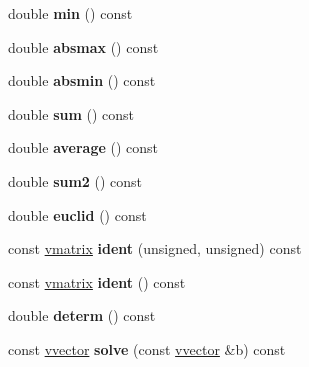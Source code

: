 \begin{DoxyCompactItemize}
\item 
double {\bfseries min} () const \hypertarget{classvmatrix_a825940bfd88c4cc05b129263b6383d8f}{}\label{classvmatrix_a825940bfd88c4cc05b129263b6383d8f}

\item 
double {\bfseries absmax} () const \hypertarget{classvmatrix_a73c48ad906dc6fc47c3d28895de5fbbb}{}\label{classvmatrix_a73c48ad906dc6fc47c3d28895de5fbbb}

\item 
double {\bfseries absmin} () const \hypertarget{classvmatrix_a16c7994199a410269478afd262ffad8e}{}\label{classvmatrix_a16c7994199a410269478afd262ffad8e}

\item 
double {\bfseries sum} () const \hypertarget{classvmatrix_a376a979dd7dd69e21a64c0fad6b2714e}{}\label{classvmatrix_a376a979dd7dd69e21a64c0fad6b2714e}

\item 
double {\bfseries average} () const \hypertarget{classvmatrix_afd1bac2391891098889e66f1f19da102}{}\label{classvmatrix_afd1bac2391891098889e66f1f19da102}

\item 
double {\bfseries sum2} () const \hypertarget{classvmatrix_a04d209c98651a566ea0e1fc1db65a593}{}\label{classvmatrix_a04d209c98651a566ea0e1fc1db65a593}

\item 
double {\bfseries euclid} () const \hypertarget{classvmatrix_afeba93d4669ff50db5098958f463432b}{}\label{classvmatrix_afeba93d4669ff50db5098958f463432b}

\item 
const \hyperlink{classvmatrix}{vmatrix} {\bfseries ident} (unsigned, unsigned) const \hypertarget{classvmatrix_a970eeee16227ceb7c4b85790f72f7b3a}{}\label{classvmatrix_a970eeee16227ceb7c4b85790f72f7b3a}

\item 
const \hyperlink{classvmatrix}{vmatrix} {\bfseries ident} () const \hypertarget{classvmatrix_a0b41ba97618f2de1ea4dad0bfce75112}{}\label{classvmatrix_a0b41ba97618f2de1ea4dad0bfce75112}

\item 
double {\bfseries determ} () const \hypertarget{classvmatrix_a41e929b2e1cbc3f77e72e49350a62e66}{}\label{classvmatrix_a41e929b2e1cbc3f77e72e49350a62e66}

\item 
const \hyperlink{classvvector}{vvector} {\bfseries solve} (const \hyperlink{classvvector}{vvector} \&b) const \hypertarget{classvmatrix_a2593085846ae2181af117b6ec257b11c}{}\label{classvmatrix_a2593085846ae2181af117b6ec257b11c}


\end{DoxyCompactItemize}
